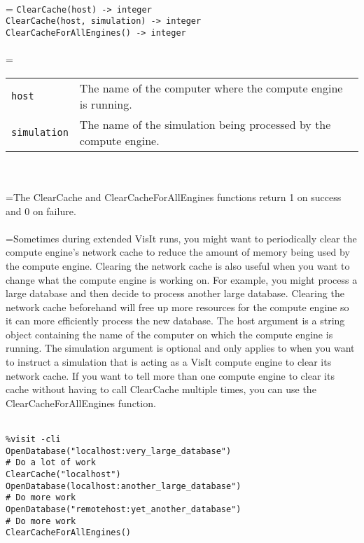 \documentclass[10pt,a4paper]{report}
\begin{document}
 \\ 
\hangindent=\parindent 
\verb!ClearCache(host) -> integer!\\ 
\verb!ClearCache(host, simulation) -> integer!\\ 
\verb!ClearCacheForAllEngines() -> integer!\\ [-3mm]

 \\ 
\hangindent=\parindent 
\begin{tabular}{lp{9cm}}
\verb!host! & The name of the computer where the compute engine is running. \\
\verb!simulation! & The name of the simulation being processed by the compute engine. \\
\end{tabular} \\[-2mm]


 \\ 
\hangindent=\parindent The ClearCache and ClearCacheForAllEngines functions return 1 on success and 0 on failure. \\[-3mm] 

 \\ 
\hangindent=\parindent Sometimes during extended VisIt runs, you might want to periodically clear the compute engine's network cache to reduce the amount of memory being used by the compute engine. Clearing the network cache is also useful when you want to change what the compute engine is working on. For example, you might process a large database and then decide to process another large database. Clearing the network cache beforehand will free up more resources for the compute engine so it can more efficiently process the new database. The host argument is a string object containing the name of the computer on which the compute engine is running. The simulation argument is optional and only applies to when you want to instruct a simulation that is acting as a VisIt compute engine to clear its network cache. If you want to tell more than one compute engine to clear its cache without having to call ClearCache multiple times, you can use the ClearCacheForAllEngines function. \\[-3mm] 

\\[-6mm]
\begin{verbatim}%visit -cli
OpenDatabase("localhost:very_large_database")
# Do a lot of work
ClearCache("localhost")
OpenDatabase(localhost:another_large_database")
# Do more work
OpenDatabase("remotehost:yet_another_database")
# Do more work
ClearCacheForAllEngines()
\end{verbatim}
\newpage
\end{document}
